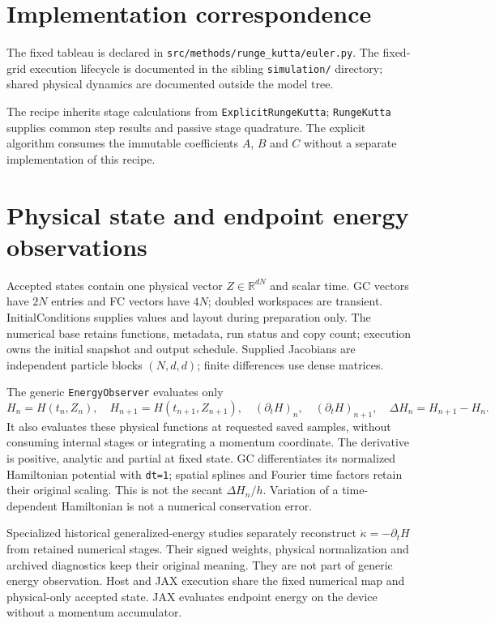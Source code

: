 \documentclass[11pt,a4paper]{article}
\begin{document}
\section{Implementation correspondence}

The fixed tableau is declared in
\texttt{src/methods/runge\_kutta/euler.py}.  The fixed-grid execution
lifecycle is documented in the sibling \texttt{simulation/} directory; shared
physical dynamics are documented outside the model tree.

The recipe inherits stage calculations from \texttt{ExplicitRungeKutta};
\texttt{RungeKutta} supplies common step results and passive stage quadrature.
The explicit algorithm consumes the immutable coefficients $A$, $B$ and $C$
without a separate implementation of this recipe.

\section{Physical state and endpoint energy observations}
Accepted states contain one physical vector $Z\in\mathbb{R}^{dN}$ and scalar time.
GC vectors have $2N$ entries and FC vectors have $4N$; doubled workspaces are
transient. InitialConditions supplies values and layout during preparation only.
The numerical base retains functions, metadata, run status and copy count;
execution owns the initial snapshot and output schedule. Supplied Jacobians are
independent particle blocks $(N,d,d)$; finite differences use dense matrices.

The generic \texttt{EnergyObserver} evaluates only
\[
 H_n=H(t_n,Z_n),\quad H_{n+1}=H(t_{n+1},Z_{n+1}),\quad
 (\partial_tH)_n,\quad (\partial_tH)_{n+1},\quad
 \Delta H_n=H_{n+1}-H_n.
\]
It also evaluates these physical functions at requested saved samples, without
consuming internal stages or integrating a momentum coordinate. The derivative
is positive, analytic and partial at fixed state. GC differentiates its normalized
Hamiltonian potential with \texttt{dt=1}; spatial splines and Fourier time factors
retain their original scaling. This is not the secant $\Delta H_n/h$.
Variation of a time-dependent Hamiltonian is not a numerical conservation error.

Specialized historical generalized-energy studies separately reconstruct
$\dot\kappa=-\partial_tH$ from retained numerical stages. Their signed weights,
physical normalization and archived diagnostics keep their original meaning.
They are not part of generic energy observation. Host and JAX execution share
the fixed numerical map and physical-only accepted state. JAX evaluates endpoint
energy on the device without a momentum accumulator.
\end{document}
